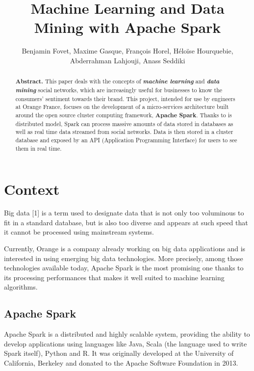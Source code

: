 \documentclass[11pt]{article}
\title{\textbf{Machine Learning and Data Mining with Apache Spark}}
\author{Benjamin Fovet, Maxime Gasque, François Horel, Héloïse Hourquebie, Abderrahman Lahjouji, Anass Seddiki}
\affil{\texttt{\{bfovet, mgasque, fhorel, hhourquebie, alahjouji, aseddiki\} @enseirb-matmeca.fr}}
\date{}
\begin{document}
\maketitle

\begin{abstract}
\textbf{Abstract.} This paper deals with the concepts of \textbf{\textit{machine learning}} and \textbf{\textit{data mining}} social networks, which are increasingly useful for businesses to know the consumers' sentiment towards their brand. This project, intended for use by engineers at \textsf{Orange France}, focuses on the development of a micro-services architecture built around the open source cluster computing framework, \textsf{\textbf{Apache Spark}}. Thanks to is distributed model, \textsf{Spark} can process massive amounts of data stored in databases as well as real time data streamed from social networks. Data is then stored in a cluster database and exposed by an API (Application Programming Interface) for users to see them in real time.
\end{abstract}

\section{Context}
Big data [1] is a term used to designate data that is not only too voluminous to fit in a standard database, but is also too diverse and appears at such speed that it cannot be processed using mainstream systems. 
\vskip 9pt

Currently, \textsf{Orange} is a company already working on big data applications and is interested in using emerging big data technologies. More precisely, among those technologies available today, \textsf{Apache Spark} is the most promising one thanks to its processing performances that makes it well suited to machine learning algorithms.

\subsection{Apache Spark}
\label{apache spark}
\textsf{Apache Spark} is a distributed and highly scalable system, providing the ability to develop applications using languages like \textsf{Java}, \textsf{Scala} (the language used to write \textsf{Spark} itself), \textsf{Python} and \textsf{R}. It was originally developed at the University of California, Berkeley and donated to the Apache Software Foundation in 2013.
\end{document}
